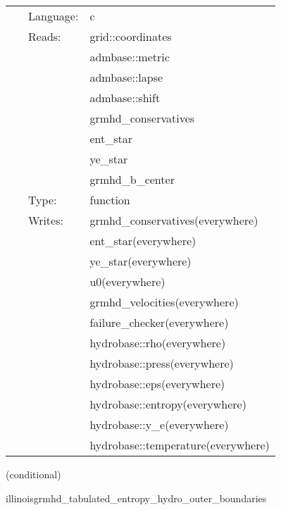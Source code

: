  \begin{tabular*}{160mm}{cll} 
~ & Language:  & c \\ 
~ & Reads:  & grid::coordinates \\ 
~& ~ &admbase::metric\\ 
~& ~ &admbase::lapse\\ 
~& ~ &admbase::shift\\ 
~& ~ &grmhd\_conservatives\\ 
~& ~ &ent\_star\\ 
~& ~ &ye\_star\\ 
~& ~ &grmhd\_b\_center\\ 
~ & Type:  & function \\ 
~ & Writes:  & grmhd\_conservatives(everywhere) \\ 
~& ~ &ent\_star(everywhere)\\ 
~& ~ &ye\_star(everywhere)\\ 
~& ~ &u0(everywhere)\\ 
~& ~ &grmhd\_velocities(everywhere)\\ 
~& ~ &failure\_checker(everywhere)\\ 
~& ~ &hydrobase::rho(everywhere)\\ 
~& ~ &hydrobase::press(everywhere)\\ 
~& ~ &hydrobase::eps(everywhere)\\ 
~& ~ &hydrobase::entropy(everywhere)\\ 
~& ~ &hydrobase::y\_e(everywhere)\\ 
~& ~ &hydrobase::temperature(everywhere)\\ 
\end{tabular*} 


\vspace{5mm}

   (conditional) 

\hspace{5mm} illinoisgrmhd\_tabulated\_entropy\_hydro\_outer\_boundaries 

\hspace{5mm}{\it entropy+tabulated version of illinoisgrmhd\_outer\_boundaries } 


\hspace{5mm}

